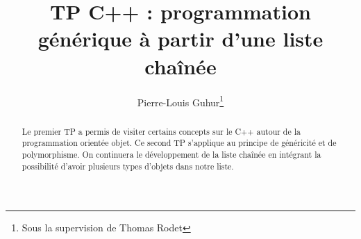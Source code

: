 \documentclass[abstracton]{scrartcl}
\title{TP C++ : programmation générique à partir d'une liste chaînée}
\author{Pierre-Louis Guhur\footnote{Sous la supervision de Thomas Rodet}}
\newcommand*{\rootPath}{./}
\begin{document}
\maketitle

\begin{abstract}
Le premier TP a permis de visiter certains concepts sur le C++ autour de la programmation orientée objet. Ce second TP s'applique au principe de généricité et de polymorphisme.
On continuera le développement de la liste chaînée en intégrant la possibilité d'avoir plusieurs types d'objets dans notre liste.
\end{abstract}









%
%






\end{document}
